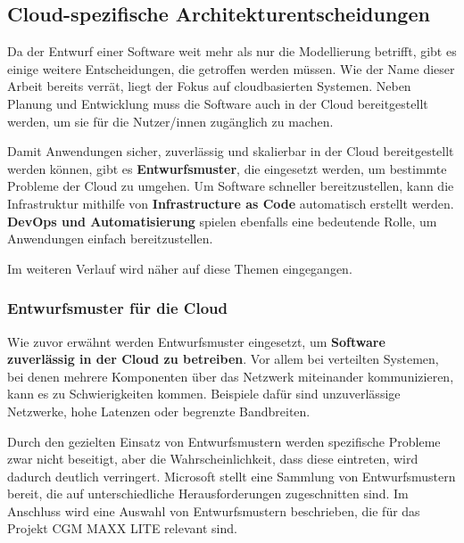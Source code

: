 
\subsection{Cloud-spezifische Architekturentscheidungen}

Da der Entwurf einer Software weit mehr als nur die Modellierung betrifft, gibt es einige weitere Entscheidungen, die getroffen werden müssen.
Wie der Name dieser Arbeit bereits verrät, liegt der Fokus auf cloudbasierten Systemen. Neben Planung und Entwicklung muss die Software auch in der Cloud bereitgestellt werden, um sie für die Nutzer/innen zugänglich zu machen.

Damit Anwendungen sicher, zuverlässig und skalierbar in der Cloud bereitgestellt werden können, gibt es \textbf{Entwurfsmuster}, die eingesetzt werden, um bestimmte Probleme der Cloud zu umgehen. Um Software schneller bereitzustellen, kann die Infrastruktur mithilfe von \textbf{Infrastructure as Code} automatisch erstellt werden. \textbf{DevOps und Automatisierung} spielen ebenfalls eine bedeutende Rolle, um Anwendungen einfach bereitzustellen.
\cite{EA:Web30, EA:Web31}

Im weiteren Verlauf wird näher auf diese Themen eingegangen.



    \subsubsection{Entwurfsmuster für die Cloud} \label{Entwurfsmuster für die Cloud}

    Wie zuvor erwähnt werden Entwurfsmuster eingesetzt, um \textbf{Software zuverlässig in der Cloud zu betreiben}. 
    Vor allem bei verteilten Systemen, bei denen mehrere Komponenten über das Netzwerk miteinander kommunizieren, kann es zu Schwierigkeiten kommen.
    Beispiele dafür sind unzuverlässige Netzwerke, hohe Latenzen oder begrenzte Bandbreiten.

    \clearpage

    Durch den gezielten Einsatz von Entwurfsmustern werden spezifische Probleme zwar nicht beseitigt, aber die Wahrscheinlichkeit, dass diese eintreten, wird dadurch deutlich verringert. Microsoft stellt eine Sammlung von Entwurfsmustern bereit, die auf unterschiedliche Herausforderungen zugeschnitten sind.
    Im Anschluss wird eine Auswahl von Entwurfsmustern beschrieben, die für das Projekt CGM MAXX LITE relevant sind.
    \cite{EA:Web31}

